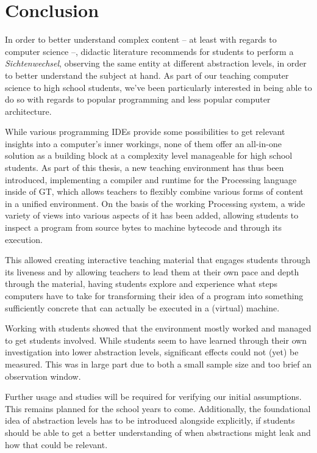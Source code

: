 
\chapter{Conclusion} \label{ch_conclusion}

In order to better understand complex content -- at least with regards to computer science --, didactic literature recommends for students to perform a \emph{Sichtenwechsel}, \ie observing the same entity at different abstraction levels, in order to better understand the subject at hand. As part of our teaching computer science to high school students, we've been particularly interested in being able to do so with regards to popular programming and less popular computer architecture.

While various programming \acp{IDE} provide some possibilities to get relevant insights into a computer's inner workings, none of them offer an all-in-one solution as a building block at a complexity level manageable for high school students. As part of this thesis, a new teaching environment has thus been introduced, implementing a compiler and runtime for the Processing language inside of \acf{GT}, which allows teachers to flexibly combine various forms of content in a unified environment. On the basis of the working Processing system, a wide variety of views into various aspects of it has been added, allowing students to inspect a program from source bytes to machine bytecode and through its execution.

This allowed creating interactive teaching material that engages students through its liveness and by allowing teachers to lead them at their own pace and depth through the material, having students explore and experience what steps computers have to take for transforming their idea of a program into something sufficiently concrete that can actually be executed in a (virtual) machine.

Working with students showed that the environment mostly worked and managed to get students involved. While students seem to have learned through their own investigation into lower abstraction levels, significant effects could not (yet) be measured. This was in large part due to both a small sample size and too brief an observation window.

Further usage and studies will be required for verifying our initial assumptions. This remains planned for the school years to come. Additionally, the foundational idea of abstraction levels has to be introduced alongside explicitly, if students should be able to get a better understanding of when abstractions might leak and how that could be relevant.



